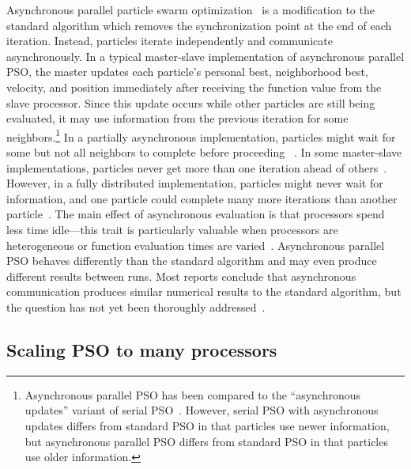 \documentclass[smallcondensed]{svjour3}
\begin{document}
Asynchronous parallel particle swarm
optimization~\citep{venter-2005-parallel-pso-asynchronous-evaluations,
koh-2006-parallel-asynchronous-pso} is a modification to the standard algorithm
which removes the synchronization point at the end of each iteration.  Instead,
particles iterate independently and communicate asynchronously.  In a typical
master-slave implementation of asynchronous parallel PSO, the master updates
each particle's personal best, neighborhood best, velocity, and position
immediately after receiving the function value from the slave processor.  Since
this update occurs while other particles are still being evaluated, it may use
information from the previous iteration for some
neighbors.\footnote{Asynchronous parallel PSO has been compared to the
``asynchronous updates'' variant of serial
PSO~\citep{koh-2006-parallel-asynchronous-pso}.  However, serial PSO with
asynchronous updates differs from standard PSO in that particles use newer
information, but asynchronous parallel PSO differs from standard PSO in that
particles use older information.} In a partially asynchronous implementation,
particles might wait for some but not all neighbors to complete before
proceeding~%
\citep{scriven-2008-asynchronous-pso-in-unreliable-distributed-environments}.
In some master-slave implementations, particles never get more than one
iteration ahead of
others~\citep{venter-2005-parallel-pso-asynchronous-evaluations,
koh-2006-parallel-asynchronous-pso}.  However, in a fully distributed
implementation, particles might never wait for information, and one particle
could complete many more iterations than another
particle~\citep{scriven-2008-distributed-pso-using-peer-to-peer}.  The main
effect of asynchronous evaluation is that processors spend less time
idle---this trait is particularly valuable when processors are heterogeneous or
function evaluation times are
varied~\citep{venter-2005-parallel-pso-asynchronous-evaluations,
koh-2006-parallel-asynchronous-pso}.  Asynchronous parallel PSO behaves
differently than the standard algorithm and may even produce different results
between runs.  Most reports conclude that asynchronous communication produces
similar numerical results to the standard algorithm, but the question has not
yet been thoroughly
addressed~\citep{venter-2005-parallel-pso-asynchronous-evaluations,
koh-2006-parallel-asynchronous-pso}.

\subsection{Scaling PSO to many processors}
\end{document}
